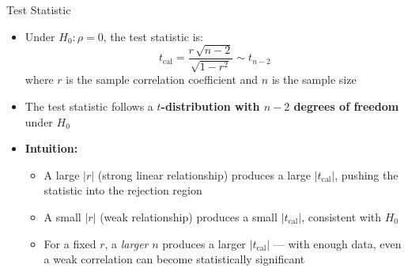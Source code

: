 \documentclass[12pt, aspectratio=169]{beamer}
\begin{document}
    \begin{frame}{Test Statistic}
        \begin{itemize}
            \item Under $H_0: \rho = 0$, the test statistic is:
            \[
                t_{\text{cal}} = \frac{r\,\sqrt{n-2}}{\sqrt{1-r^2}} \sim t_{n-2}
            \]
            where $r$ is the sample correlation coefficient and $n$ is the
            sample size
            \item The test statistic follows a \textbf{$t$-distribution with
                $n - 2$ degrees of freedom} under $H_0$
            \item \textbf{Intuition:}
            \begin{itemize}
                \item A large $|r|$ (strong linear relationship) produces a large
                    $|t_{\text{cal}}|$, pushing the statistic into the rejection
                    region
                \item A small $|r|$ (weak relationship) produces a small
                    $|t_{\text{cal}}|$, consistent with $H_0$
                \item For a fixed $r$, a \emph{larger} $n$ produces a larger
                    $|t_{\text{cal}}|$ --- with enough data, even a weak
                    correlation can become statistically significant
            \end{itemize}
        \end{itemize}
    \end{frame}
\end{document}
